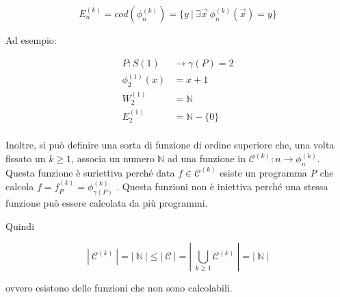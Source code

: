 $$
E_{n}^{(k)} = cod(\phi_{n}^{(k)}) = \{y\:|\: \exists\vec{x} \: \phi_{n}^{(k)}(\vec{x}) = y  \}
$$

Ad esempio:

\begin{align*}
P: S(1) &\rightarrow \gamma(P) = 2 \\
\phi_{2}^{(1)}(x) &= x+1 \\
W_{2}^{(1)} &= \mathbb{N} \\
E_{2}^{(1)} &= \mathbb{N} - \{0\} \\
\end{align*}

Inoltre, si può definire una sorta di funzione di ordine superiore che, una volta fissato un $ k \geq 1$, associa un numero $ \mathbb{N} $ ad una funzione in $ \mathcal{C}^{(k)} : n \rightarrow  \phi_{n}^{(k)}$. Questa funzione è suriettiva perché data $ f \in \mathcal{C}^{(k)} $ esiste un programma \textit{P} che calcola $ f = f_{P}^{(k)} = \phi_{\gamma(P)}^{(k)} $ .
Questa funzioni non è iniettiva perché una stessa funzione può essere calcolata da più programmi.

Quindi 

$$
|\: \mathcal{C}^{(k)}\:| =  |\: \mathbb{N}\:| \leq |\: \mathcal{C}\:| = |\: \bigcup\limits_{k \geq 1} \mathcal{C}^{(k)} \:| = |\: \mathbb{N}\: |
$$

ovvero esistono delle funzioni che non sono calcolabili.













